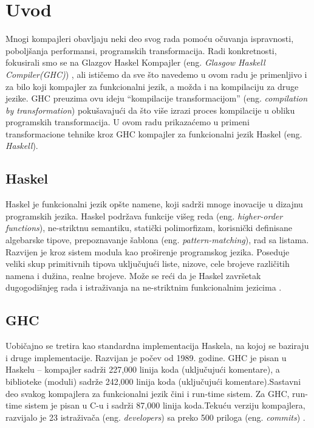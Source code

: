 \section{Uvod}
\label{sec:uvod}

Mnogi kompajleri obavljaju neki deo svog rada pomoću očuvanja ispravnosti, poboljšanja performansi, programskih transformacija. Radi konkretnosti, fokusirali smo se na Glazgov Haskel Kompajler (eng. \emph{Glasgow Haskell Compiler(GHC)}) \cite{GHCxx}, ali ističemo da sve što navedemo u ovom radu je primenljivo i za bilo koji kompajler za funkcionalni jezik, a možda i na kompilaciju za druge jezike. GHC preuzima ovu ideju “kompilacije transformacijom” (eng. \emph{compilation by transformation}) pokušavajući da što više izrazi proces kompilacije u obliku programskih transformacija. U ovom radu prikazaćemo u primeni transformacione tehnike kroz GHC kompajler za funkcionalni jezik Haskel (eng. \emph{Haskell}).

\subsection{Haskel}
\label{subsec:podnaslovHaskel}
Haskel je funkcionalni jezik opšte namene, koji sadrži mnoge inovacije u dizajnu programskih jezika. Haskel podržava funkcije višeg reda (eng. \emph{ higher-order functions}), ne-striktnu semantiku, statički polimorfizam, korisnički definisane algebarske tipove, prepoznavanje šablona (eng. \emph{ pattern-matching}), rad sa listama. Razvijen je kroz sistem modula kao proširenje programskog jezika. Poseduje veliki skup primitivnih tipova uključujući liste, nizove, cele brojeve različitih namena i dužina, realne brojeve. Može se reći da je Haskel završetak dugogodišnjeg rada i istraživanja na ne-striktnim funkcionalnim jezicima \cite{Has10}. 

\subsection{GHC}
\label{subsec:podnaslovGHC}

Uobičajno se tretira kao standardna implementacija Haskela, na kojoj se baziraju i druge implementacije. Razvijan je počev od 1989. godine. GHC je pisan u Haskelu – kompajler sadrži 227,000 linija koda (uključujući komentare), a biblioteke (moduli) sadrže 242,000 linija koda (uključujući komentare).Sastavni deo svakog kompajlera za funkcionalni jezik čini i run-time sistem. Za GHC, run-time sistem je pisan u C-u i sadrži 87,000 linija koda.Tekuću verziju kompajlera, razvijalo je 23 istraživača (eng. \emph{developers}) sa preko 500 priloga (eng. \emph {commits}) \cite{StanfordGHC}.  


